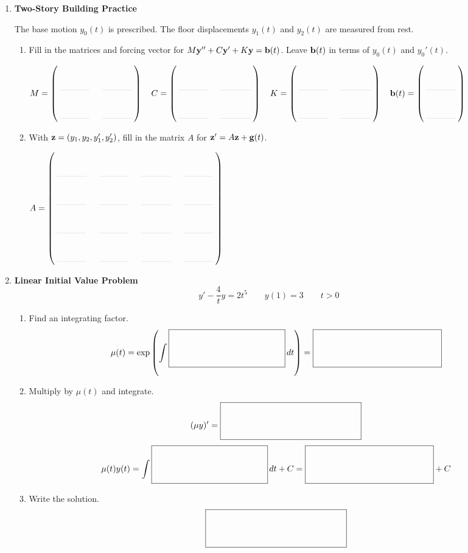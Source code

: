 \documentclass[11pt,letterpaper]{article}
\newcommand{\TwoByTwoAnswer}{\begin{pmatrix}
  \AnswerEntry & \AnswerEntry\\
  \AnswerEntry & \AnswerEntry
\end{pmatrix}}
\newcommand{\TwoEntryAnswer}{\begin{pmatrix}
  \AnswerEntry\\
  \AnswerEntry
\end{pmatrix}}
\newcommand{\FourByFourAnswer}{\begin{pmatrix}
  \AnswerEntry & \AnswerEntry & \AnswerEntry & \AnswerEntry\\
  \AnswerEntry & \AnswerEntry & \AnswerEntry & \AnswerEntry\\
  \AnswerEntry & \AnswerEntry & \AnswerEntry & \AnswerEntry\\
  \AnswerEntry & \AnswerEntry & \AnswerEntry & \AnswerEntry
\end{pmatrix}}
\begin{document}
\begin{enumerate}
\item \textbf{Two-Story Building Practice}

\noindent\begin{minipage}[c]{.56\linewidth}
\end{minipage}\hfill
\begin{minipage}[c]{.40\linewidth}
  The base motion $y_0(t)$ is prescribed.
  The floor displacements $y_1(t)$ and $y_2(t)$ are measured from rest.
\end{minipage}

\begingroup
\setlength{\arraycolsep}{3pt}
\renewcommand{\AnswerEntry}{%
  \rule[-0.16in]{0pt}{0.46in}%
  \makebox[0.55in]{\textcolor{black!18}{\rule[-0.10in]{0.48in}{0.35pt}}}}
\begin{enumerate}
\item Fill in the matrices and forcing vector for
$M\mathbf{y}''+C\mathbf{y}'+K\mathbf{y}=\mathbf{b}(t)$.
Leave $\mathbf{b}(t)$ in terms of $y_0(t)$ and $y_0'(t)$.

\noindent$\displaystyle
  M=\TwoByTwoAnswer\quad C=\TwoByTwoAnswer\quad
  K=\TwoByTwoAnswer\quad \vect{b}(t)=\TwoEntryAnswer
$\par

\vfill
\item With $\mathbf{z}=(y_1,y_2,y_1',y_2')$, fill in the matrix $A$ for
$\mathbf{z}'=A\mathbf{z}+\mathbf{g}(t)$.

\noindent$\displaystyle A=\FourByFourAnswer$\par
\end{enumerate}
\endgroup

\vfill
\newpage
\item \textbf{Linear Initial Value Problem}
\[
  y'-\frac{4}{t}y=2t^5
  \qquad y(1)=3
  \qquad t>0
\]

\begin{enumerate}
\item Find an integrating factor.
\[
  \mu(t)=\exp\left(\int \LinearBlank[1.6in]\,dt\right)
  =\LinearBlank[1.8in]
\]

\vfill
\item Multiply by $\mu(t)$ and integrate.
\[
  (\mu y)'=\LinearBlank[2in]
\]
\[
  \mu(t)y(t)=\int\LinearBlank[1.6in]\,dt+C
  =\LinearBlank[1.8in]+C
\]

\vfill
\item Write the solution.
\[
  \LinearBlank
\]
\end{enumerate}
\vfill
\end{enumerate}
\end{document}
